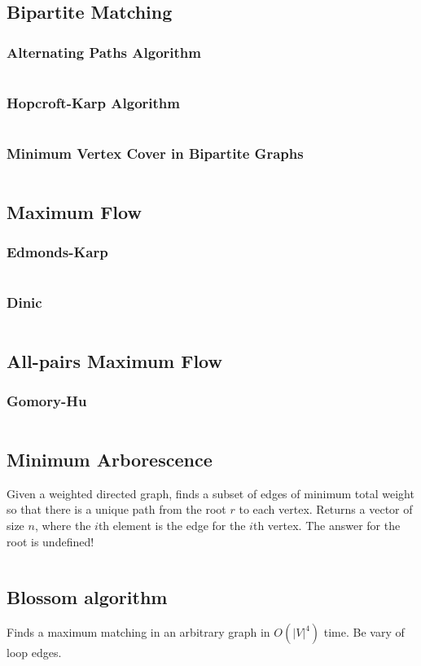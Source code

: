 \documentclass[8pt,a4paper,landscape,oneside]{amsart}
\newcommand{\code}[1]{\inputminted[fontsize=\normalsize,baselinestretch=1]{cpp}{_code/#1}}
\begin{document}
\begin{multicols*}{3}
	\subsection{Bipartite Matching}
		\subsubsection{Alternating Paths Algorithm}
      \code{graphs/bipartite_matching/bipartite_matching.cpp}
		\subsubsection{Hopcroft-Karp Algorithm}
      \code{graphs/bipartite_matching/hopcroft_karp.cpp}
    \subsubsection{Minimum Vertex Cover in Bipartite Graphs}
      \code{graphs/bipartite_matching/bipartite_mvc.cpp}
	\subsection{Maximum Flow}
		\subsubsection{Edmonds-Karp}
			\code{graphs/max_flow/edmonds_karp.cpp}
		\subsubsection{Dinic}
			\code{graphs/max_flow/dinic.cpp}
  \subsection{All-pairs Maximum Flow}
    \subsubsection{Gomory-Hu}
      \code{graphs/max_flow/gomory_hu_tree.cpp}
  \subsection{Minimum Arborescence}
    Given a weighted directed graph, finds a subset of edges of minimum
    total weight so that there is a unique path from the root $r$ to each
    vertex. Returns a vector of size $n$, where the $i$th element is the
    edge for the $i$th vertex. The answer for the root is undefined!
    \code{graphs/arborescence.cpp}
  \subsection{Blossom algorithm}
    Finds a maximum matching in an arbitrary graph in $O(|V|^4)$ time. Be
    vary of loop edges.
    \code{graphs/blossom.cpp}

\end{multicols*}
\end{document}
